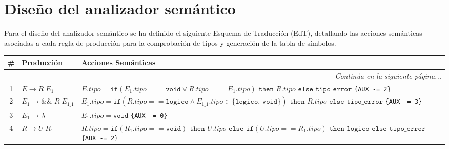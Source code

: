 \documentclass{article}
\begin{document}
\newpage

\section{Diseño del analizador semántico}

Para el diseño del analizador semántico se ha definido el siguiente Esquema de Traducción (EdT), detallando las acciones semánticas asociadas a cada regla de producción para la comprobación de tipos y generación de la tabla de símbolos.

\renewcommand{\arraystretch}{1.6} 

\begin{longtable}{|c|>{\raggedright\arraybackslash}p{5.5cm}|>{\raggedright\arraybackslash}p{10cm}|}
\hline
\textbf{\#} & \textbf{Producción} & \textbf{Acciones Semánticas} \\ \hline
\endhead

\hline
\multicolumn{3}{|r|}{\textit{Continúa en la siguiente página...}} \\
\hline
\endfoot

\hline
\endlastfoot

1 & $E \to R \; E_1$ & 
$E.tipo = \texttt{if}(E_1.tipo == \texttt{void} \lor R.tipo == E_1.tipo)$ \newline
\hspace*{0.5cm} $\texttt{then } R.tipo$ \newline
\hspace*{0.5cm} $\texttt{else tipo\_error}$ \newline
\texttt{\{AUX -= 2\}} \\ \hline

2 & $E_1 \to \&\& \; R \; E_{1\_1}$ & 
$E_1.tipo = \texttt{if}(R.tipo == \texttt{logico} \land E_{1\_1}.tipo \in \{\texttt{logico, void}\})$ \newline
\hspace*{0.5cm} $\texttt{then } R.tipo$ \newline
\hspace*{0.5cm} $\texttt{else tipo\_error}$ \newline
\texttt{\{AUX -= 3\}} \\ \hline

3 & $E_1 \to \lambda$ & 
$E_1.tipo = \texttt{void}$ \newline
\texttt{\{AUX -= 0\}} \\ \hline

4 & $R \to U \; R_1$ & 
$R.tipo = \texttt{if}(R_1.tipo == \texttt{void}) \texttt{ then } U.tipo$ \newline
\hspace*{0.5cm} $\texttt{else if}(U.tipo == R_1.tipo) \texttt{ then logico}$ \newline
\hspace*{0.5cm} $\texttt{else tipo\_error}$ \newline
\texttt{\{AUX -= 2\}} \\ \hline


\end{longtable}
\end{document}
